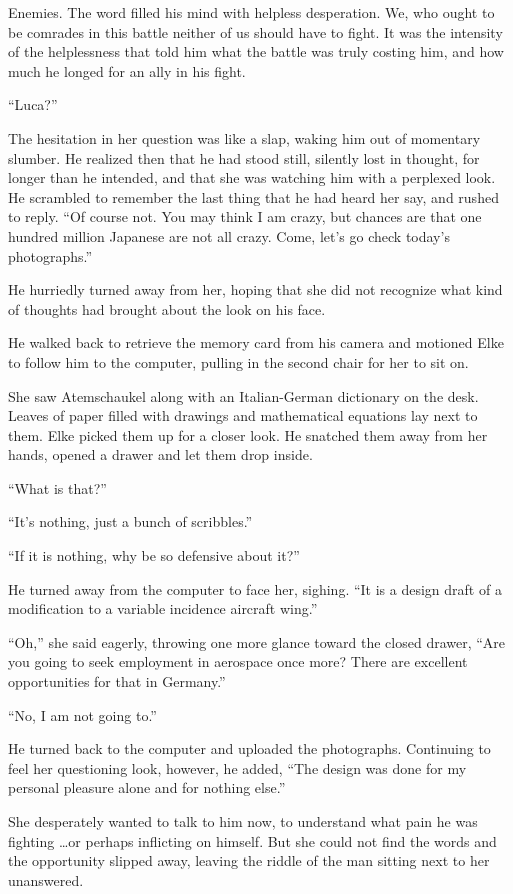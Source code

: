 Enemies. The word filled his mind with helpless desperation. We, who ought to be comrades in this battle neither of us should have to fight. It was the intensity of the helplessness that told him what the battle was truly costing him, and how much he longed for an ally in his fight.

``Luca?''

The hesitation in her question was like a slap, waking him out of momentary slumber. He realized then that he had stood still, silently lost in thought, for longer than he intended, and that she was watching him with a perplexed look. He scrambled to remember the last thing that he had heard her say, and rushed to reply. ``Of course not. You may think I am crazy, but chances are that one hundred million Japanese are not all crazy. Come, let's go check today's photographs.''

He hurriedly turned away from her, hoping that she did not recognize what kind of thoughts had brought about the look on his face.

He walked back to retrieve the memory card from his camera and motioned Elke to follow him to the computer, pulling in the second chair for her to sit on.

She saw Atemschaukel along with an Italian-German dictionary on the desk. Leaves of paper filled with drawings and mathematical equations lay next to them. Elke picked them up for a closer look. He snatched them away from her hands, opened a drawer and let them drop inside.

``What is that?''

``It's nothing, just a bunch of scribbles.''

``If it is nothing, why be so defensive about it?''

He turned away from the computer to face her, sighing. ``It is a design draft of a modification to a variable incidence aircraft wing.''

``Oh,'' she said eagerly, throwing one more glance toward the closed drawer, ``Are you going to seek employment in aerospace once more? There are excellent opportunities for that in Germany.''

``No, I am not going to.''

He turned back to the computer and uploaded the photographs. Continuing to feel her questioning look, however, he added, ``The design was done for my personal pleasure alone and for nothing else.''

She desperately wanted to talk to him now, to understand what pain he was fighting \ldots or perhaps inflicting on himself. But she could not find the words and the opportunity slipped away, leaving the riddle of the man sitting next to her unanswered.

